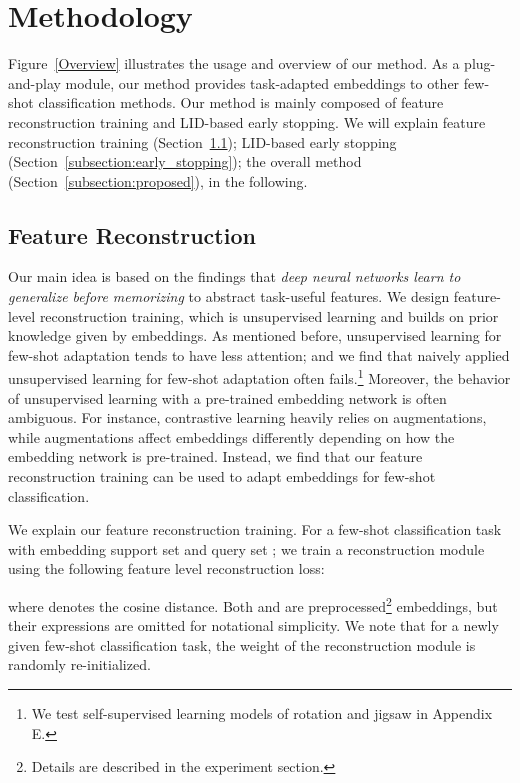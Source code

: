 \documentclass{article}
\begin{document}
\section{Methodology}
Figure~\ref{Overview} illustrates the usage and overview of our method.
As a plug-and-play module, our method provides task-adapted embeddings to other few-shot classification methods.
Our method is mainly composed of feature reconstruction training and LID-based early stopping.
We will explain feature reconstruction training (Section~\ref{subsection:feature_reconstruction}); LID-based early stopping (Section~\ref{subsection:early_stopping}); the overall method (Section~\ref{subsection:proposed}), in the following.

\subsection{Feature Reconstruction}
\label{subsection:feature_reconstruction}
Our main idea is based on the findings that \textit{deep neural networks learn to generalize before memorizing} to abstract task-useful features. We design feature-level reconstruction training, which is unsupervised learning and builds on prior knowledge given by embeddings. As mentioned before, unsupervised learning for few-shot adaptation tends to have less attention; and we find that naively applied unsupervised learning for few-shot adaptation often fails.\footnote{We test self-supervised learning models of  rotation \cite{Rotnet} and jigsaw \cite{jigsaw} in Appendix E.} Moreover, the behavior of unsupervised learning with a pre-trained embedding network is often ambiguous. For instance, contrastive learning heavily relies on augmentations, while augmentations affect embeddings differently depending on how the embedding network is pre-trained. Instead, we find that our feature reconstruction training can be used to adapt embeddings for few-shot classification.

We explain our feature reconstruction training.
For a few-shot classification task with embedding support set  and query set ; we train a reconstruction module  using the following feature level reconstruction loss:

where  denotes the cosine distance. Both  and  are preprocessed\footnote{Details are described in the experiment section.} embeddings, but their expressions are omitted for notational simplicity. We note that for a newly given few-shot classification task, the weight  of the reconstruction module is randomly re-initialized.
\end{document}

